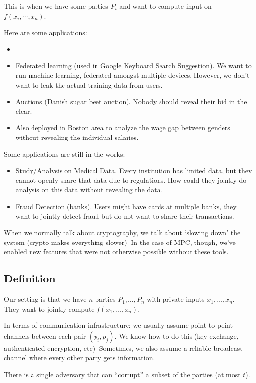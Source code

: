 This is when we have some parties $P_i$ and want to compute input on $f(x_i, \cdots, x_n)$.

Here are some applications:
\begin{itemize}
    \item {}
    \item Federated learning (used in Google Keyboard Search Suggestion). We want to run machine learning, federated amongst multiple devices. However, we don't want to leak the actual training data from users.
    \item Auctions (Danish sugar beet auction). Nobody should reveal their bid in the clear.
    \item Also deployed in Boston area to analyze the wage gap between genders without revealing the individual salaries.
\end{itemize}
Some applications are still in the works:
\begin{itemize}
    \item Study/Analysis on Medical Data. Every institution has limited data, but they cannot openly share that data due to regulations. How could they jointly do analysis on this data without revealing the data.
    \item Fraud Detection (banks). Users might have cards at multiple banks, they want to jointly detect fraud but do not want to share their transactions.
\end{itemize}

When we normally talk about cryptography, we talk about `slowing down' the system (crypto makes everything slower). In the case of MPC, though, we've enabled new features that were not otherwise possible without these tools.

\subsection{Definition}
Our setting is that we have $n$ parties $P_1, \dots, P_n$ with private inputs $x_1, \dots, x_n$. They want to jointly compute $f(x_1, \dots, x_n)$.

In terms of communication infrastructure: we usually assume point-to-point channels between each pair $(p_i, p_j)$. We know how to do this (key exchange, authenticated encryption, etc). Sometimes, we also assume a reliable broadcast channel where every other party gets information.

There is a single adversary that can ``corrupt'' a subset of the parties (at most $t$).

